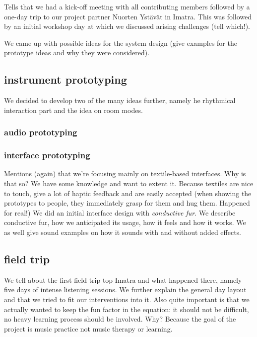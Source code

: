 \documentclass{acm_proc_article-sp}
\begin{document}
Tells that we had a kick-off meeting with all contributing members followed by a one-day trip to our project partner Nuorten Ystävät in Imatra.
This was followed by an initial workshop day at which we discussed arising challenges (tell which!).

We came up with possible ideas for the system design (give examples for the prototype ideas and why they were considered).

\subsection{instrument prototyping} %
\label{sub:instrument_prototyping}

We decided to develop two of the many ideas further, namely he rhythmical interaction part and the idea on room modes.

\subsubsection{audio prototyping} %
\label{ssub:audio_prototyping}


\subsubsection{interface prototyping} %
\label{ssub:interface_prototyping}

Mentions (again) that we're focusing mainly on textile-based interfaces.
Why is that so? 
	We have some knowledge and want to extent it. 
	Because textiles are nice to touch, give a lot of haptic feedback and are easily accepted (when showing the prototypes to people, they immediately grasp for them and hug them. Happened for real!)
We did an initial interface design with \emph{conductive fur}. 
We describe conductive fur, how we anticipated its usage, how it feels and how it works.
We as well give sound examples on how it sounds with and without added effects.


\subsection{field trip} %
\label{sub:field_trip}

We tell about the first field trip top Imatra and what happened there, namely five days of intense listening sessions.
We further explain the general day layout and that we tried to fit our interventions into it.
Also quite important is that we actually wanted to keep the fun factor in the equation: it should not be difficult, no heavy learning process should be involved. Why? Because the goal of the project is music practice not music therapy or learning.
\end{document}
